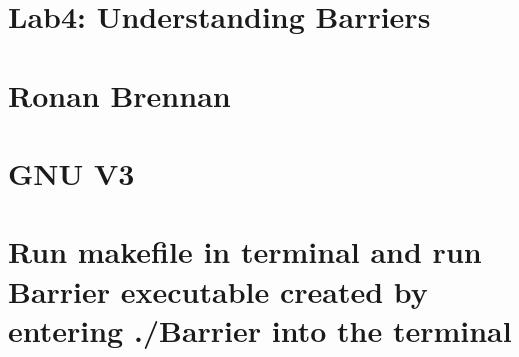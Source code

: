 \section*{Lab4\+: Understanding Barriers}

\section*{Ronan Brennan}

\section*{G\+NU V3}

\section*{Run makefile in terminal and run Barrier executable created by entering ./\+Barrier into the terminal}